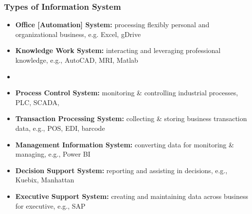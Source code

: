\documentclass[10pt,handout,notes=show]{beamer}
\begin{document}
\begin{frame}
  \frametitle{Types of Information System}


  \begin{flushleft} \small{
  \begin{itemize}
    \item \textbf{Office [Automation] System:} processing \alert{flexibly personal} and organizational business, e.g. Excel, gDrive
    \item \textbf{Knowledge Work System:} interacting and \alert{leveraging professional knowledge}, e.g., AutoCAD, MRI, Matlab
    \item[]
    \item \textbf{Process Control System:} \alert{monitoring} \& \alert{controlling} industrial processes,  PLC, SCADA,
    \item \textbf{Transaction Processing System:} \alert{collecting} \& \alert{storing} business \alert{transaction} data, e.g., POS, EDI, barcode
    \item \textbf{Management Information System:} converting data for \alert{monitoring} \& \alert{managing}, e.g., Power BI
    \item \textbf{Decision Support System:} reporting and \alert{assisting} in \alert{decisions}, e.g., Kuebix, Manhattan
    \item \textbf{Executive Support System:} creating and maintaining data \alert{across business} for executive, e.g., SAP
  \end{itemize} }
  \end{flushleft}


\end{frame}
\end{document}
